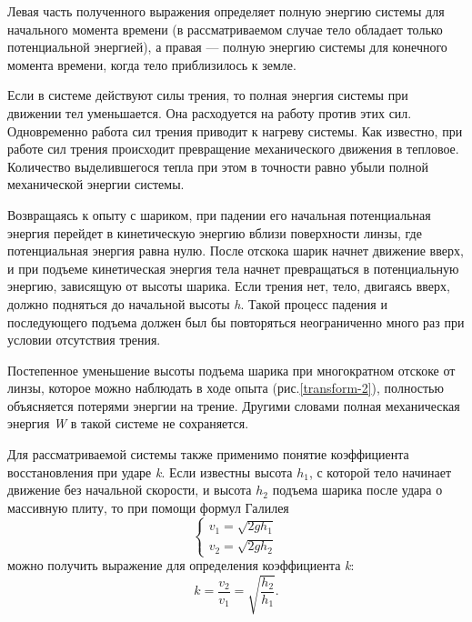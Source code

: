 \documentclass[14pt,a4paper,oneside]{extarticle}	%
\begin{document}
Левая часть полученного выражения определяет полную энергию системы для начального момента времени (в рассматриваемом случае тело обладает только потенциальной энергией), 
а правая — полную энергию системы для конечного момента времени, когда тело приблизилось к земле.

Если в системе действуют силы трения, то полная энергия системы при движении тел уменьшается.
Она расходуется на работу против этих сил.
Одновременно работа сил трения приводит к нагреву системы.
Как известно, при работе сил трения происходит превращение механического движения в тепловое.
Количество выделившегося тепла при этом в точности равно убыли полной механической энергии системы. 

Возвращаясь к опыту с шариком, при падении его начальная потенциальная энергия перейдет в кинетическую 
энергию вблизи поверхности линзы, где потенциальная энергия равна нулю.
После отскока шарик начнет движение вверх, и при подъеме кинетическая энергия тела начнет 
превращаться в потенциальную энергию, зависящую от высоты шарика.
Если трения нет, тело, двигаясь вверх, 
должно подняться до начальной высоты \textit{h}.
Такой процесс падения и последующего подъема должен был бы повторяться неограниченно много раз при условии отсутствия трения. 

Постепенное уменьшение высоты подъема шарика при многократном отскоке от линзы, которое можно 
наблюдать в ходе опыта (рис.\ref{transform-2}), полностью объясняется потерями энергии на 
трение.
Другими словами полная механическая энергия \textit{W} в такой системе не сохраняется.

Для рассматриваемой системы также применимо понятие коэффициента восстановления при ударе \textit{k}.
Если известны высота $ h_1 $, с которой тело начинает движение без начальной скорости, и высота $ h_2 $ подъема шарика после удара о массивную плиту, то при помощи формул Галилея
\begin{equation}
\begin{cases}
v_1=\sqrt{2gh_1} \\
v_2=\sqrt{2gh_2}
\end{cases}
\end{equation}
можно получить выражение для определения коэффициента \textit{k}:
\begin{equation}
k=\dfrac{v_2}{v_1}=\sqrt{\dfrac{h_2}{h_1}}.
\end{equation}
\end{document}
